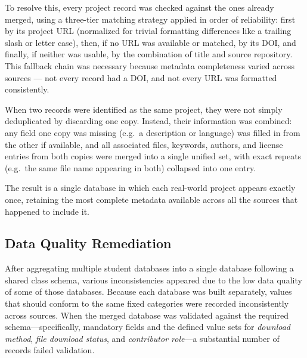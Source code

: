 To resolve this, every project record was checked against the ones already merged, using a three-tier matching strategy applied in order of reliability: first by its project URL (normalized for trivial formatting differences like a trailing slash or letter case), then, if no URL was available or matched, by its DOI, and finally, if neither was usable, by the combination of title and source repository. This fallback chain was necessary because metadata completeness varied across sources --- not every record had a DOI, and not every URL was formatted consistently.

When two records were identified as the same project, they were not simply deduplicated by discarding one copy. Instead, their information was combined: any field one copy was missing (e.g.\ a description or language) was filled in from the other if available, and all associated files, keywords, authors, and license entries from both copies were merged into a single unified set, with exact repeats (e.g.\ the same file name appearing in both) collapsed into one entry.

The result is a single database in which each real-world project appears exactly once, retaining the most complete metadata available across all the sources that happened to include it.

\subsection{Data Quality Remediation}

After aggregating multiple student databases into a single database following a shared class schema, various inconsistencies appeared due to the low data quality of some of those databases. Because each database was built separately, values that should conform to the same fixed categories were recorded inconsistently across sources. When the merged database was validated against the required schema---specifically, mandatory fields and the defined value sets for \textit{download method}, \textit{file download status}, and \textit{contributor role}---a substantial number of records failed validation.

